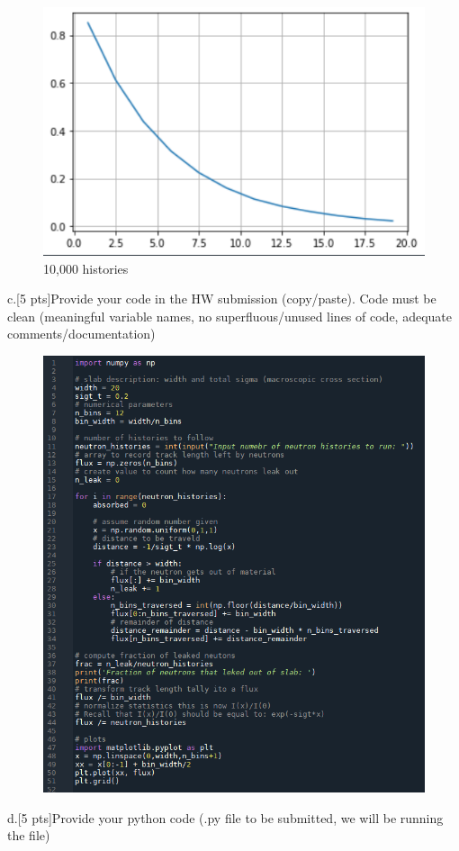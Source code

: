 \documentclass[12pt,fleqn, parskip=full]{scrartcl}
\begin{document}
\begin{figure}[H]
	\centering
	\includegraphics[scale=1]{Image_6_hw_2}
	\caption{10,000 histories}
\end{figure}
c.[5 pts]Provide your code in the HW submission (copy/paste). Code must be clean (meaningful variable names, no superfluous/unused lines of code, adequate comments/documentation)\\
\begin{figure}[H]
	\centering
	\includegraphics[scale=1]{Image_7_hw_2}
\end{figure}
d.[5 pts]Provide your python code (.py file to be submitted, we will be running the file)\\
\end{document}
